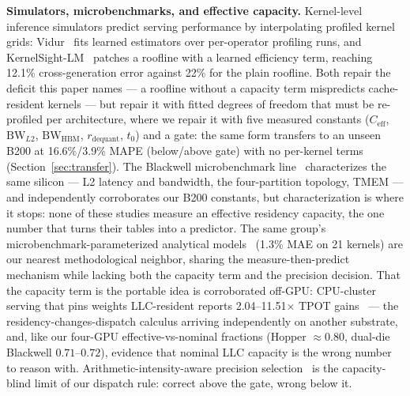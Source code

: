 \textbf{Simulators, microbenchmarks, and effective capacity.}  Kernel-level inference simulators predict serving performance by interpolating profiled kernel grids: Vidur~\cite{vidur} fits learned estimators over per-operator profiling runs, and KernelSight-LM~\cite{yao2026kernelsight} patches a roofline with a learned efficiency term, reaching 12.1\% cross-generation error against 22\% for the plain roofline.  Both repair the deficit this paper names --- a roofline without a capacity term mispredicts cache-resident kernels --- but repair it with fitted degrees of freedom that must be re-profiled per architecture, where we repair it with five measured constants ($C_\text{eff}$, $\mathrm{BW}_{L2}$, $\mathrm{BW}_\text{HBM}$, $r_\text{dequant}$, $t_0$) and a gate: the same form transfers to an unseen B200 at 16.6\%/3.9\% MAPE (below/above gate) with no per-kernel terms (Section~\ref{sec:transfer}).  The Blackwell microbenchmark line~\cite{dissecting2025blackwell,blackwell2025microbench} characterizes the same silicon --- L2 latency and bandwidth, the four-partition topology, TMEM --- and independently corroborates our B200 constants, but characterization is where it stops: none of these studies measure an effective residency capacity, the one number that turns their tables into a predictor.  The same group's microbenchmark-parameterized analytical models~\cite{jarmusch2026analytical} (1.3\% MAE on 21 kernels) are our nearest methodological neighbor, sharing the measure-then-predict mechanism while lacking both the capacity term and the precision decision.  That the capacity term is the portable idea is corroborated off-GPU: CPU-cluster serving that pins weights LLC-resident reports 2.04--11.51$\times$ TPOT gains~\cite{zhang2026cacheresident} --- the residency-changes-dispatch calculus arriving independently on another substrate, and, like our four-GPU effective-vs-nominal fractions (Hopper ${\approx}0.80$, dual-die Blackwell $0.71$--$0.72$), evidence that nominal LLC capacity is the wrong number to reason with.  Arithmetic-intensity-aware precision selection~\cite{aiaq2025} is the capacity-blind limit of our dispatch rule: correct above the gate, wrong below it.

